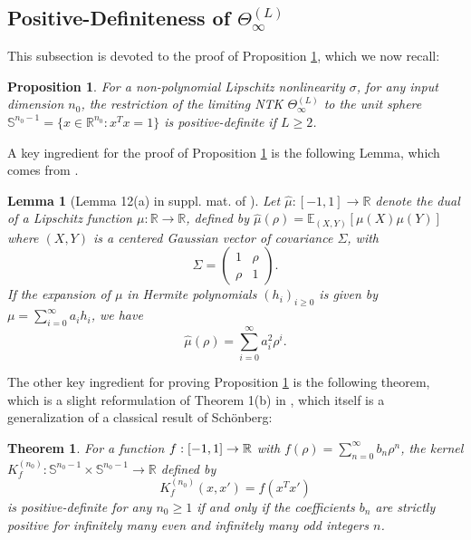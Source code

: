 \documentclass{article}
\newtheorem{prop}{Proposition}
\newtheorem{thm}{Theorem}
\newtheorem{lem}{Lemma}
\begin{document}
\subsection{Positive-Definiteness of $ \Theta_\infty^{(L)} $} \label{Appendix-4}
This subsection is devoted to the proof of Proposition \ref{prop:pos-def}, which we now recall:
\begin{prop}
\label{prop:pos-def}For a non-polynomial Lipschitz nonlinearity $\sigma$,
for any input dimension $n_{0}$, the restriction of the limiting
NTK $\Theta_{\infty}^{(L)}$ to the unit sphere $\mathbb{S}^{n_{0}-1}=\{x\in\mathbb{R}^{n_{0}}:x^{T}x=1\}$
is positive-definite if $L\geq2$. 
\end{prop}

A key ingredient for the proof of Proposition \ref{prop:pos-def}
is the following Lemma, which comes from \cite{Daniely}.
\begin{lem}[Lemma 12(a) in suppl. mat. of \cite{Daniely}]
\label{lem:daniely}Let $\hat{\mu}:\left[-1,1\right]\to\mathbb{R}$
denote the dual of a Lipschitz function $\mu:\mathbb{R}\to\mathbb{R}$,
defined by $\hat{\mu}\left(\rho\right)=\mathbb{E}_{\left(X,Y\right)}\left[\mu\left(X\right)\mu\left(Y\right)\right]$
where $\left(X,Y\right)$ is a centered Gaussian vector of covariance
$\Sigma$, with 
\[
\Sigma=\begin{pmatrix}1 & \rho\\
\rho & 1
\end{pmatrix}.
\]
If the expansion of $\mu$ in Hermite polynomials $\left(h_{i}\right)_{i\geq0}$
is given by $\mu=\sum_{i=0}^{\infty}a_{i}h_{i}$, we have 
\[
	\hat{\mu}\left(\rho\right)=\sum_{i=0}^{\infty}a_{i}^{2}\rho^{i}.
\] 
\end{lem}

The other key ingredient for proving Proposition \ref{prop:pos-def}
is the following theorem, which is a slight reformulation of Theorem
1(b) in \cite{Gneiting}, which itself is a generalization of a classical result
of Sch\"onberg:
\begin{thm}
\label{thm:schoenberg}For a function $f:\text{\ensuremath{\left[-1,1\right]}}\to\mathbb{R}$ with $f\left(\rho\right)=\sum_{n=0}^{\infty}b_{n}\rho^{n}$,
the kernel $K_{f}^{\left(n_{0}\right)}:\mathbb{S}^{n_{0}-1}\times\mathbb{S}^{n_{0}-1}\to\mathbb{R}$
defined by
\[
K_{f}^{\left(n_{0}\right)}\left(x,x'\right)=f\left(x^{T}x'\right)
\]
 is positive-definite for any $n_{0}\geq1$ if and only if 
the coefficients $b_{n}$ are strictly positive for infinitely
many even and infinitely many odd integers $n$. 
\end{thm}
\end{document}
